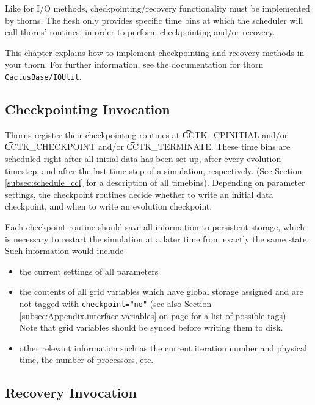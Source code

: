 Like for I/O methods, checkpointing/recovery functionality must be implemented
by thorns. The flesh only provides specific time bins at which the scheduler
will call thorns' routines, in order to perform checkpointing and/or recovery.

This chapter explains how to implement checkpointing and recovery methods
in your thorn.  For further information, see the documentation for thorn
\texttt{CactusBase/IOUtil}.

\subsection{Checkpointing Invocation}

Thorns register their checkpointing routines at {\t CCTK\_CPINITIAL} and/or
{\t CCTK\_CHECKPOINT} and/or {\t CCTK\_TERMINATE}. These time bins are
scheduled right after all initial data has been set up, after every
evolution timestep, and after the last time step of a simulation,
respectively. (See Section \ref{subsec:schedule_ccl} for a description of all timebins).
Depending on
parameter settings, the checkpoint routines decide whether to write an initial
data checkpoint, and when to write an evolution checkpoint.

Each checkpoint routine should save all information to persistent storage, which
is necessary to restart the simulation at a later time from exactly the same
state. Such information would include
%
\begin{itemize}
  \item the current settings of all parameters
  \item the contents of all grid variables which have global storage assigned
    and are not tagged with {\tt checkpoint="no"} (see also Section \ref{subsec:Appendix.interface-variables} on page \pageref{subsec:Appendix.interface-variables} for a list of possible tags)\\
    Note that grid variables should be synced before writing them to disk.
  \item other relevant information such as the current iteration number and
    physical time, the number of processors, etc.
\end{itemize}


\subsection{Recovery Invocation}

